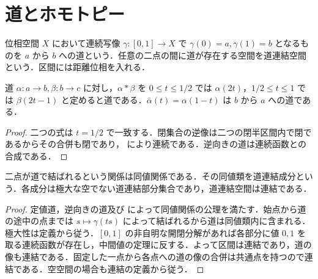 \section{道とホモトピー}
\begin{defn}[道と道連結性]
位相空間 $X$ において連続写像 $\gamma:[0,1]\to X$ で $\gamma(0)=a,\gamma(1)=b$ となるものを $a$ から $b$ への道という．任意の二点の間に道が存在する空間を道連結空間という．区間には距離位相を入れる．
\end{defn}
\begin{prop}[道の合成と逆向きの道]
道 $\alpha:a\to b,\beta:b\to c$ に対し，$\alpha*\beta$ を $0\leq t\leq1/2$ では $\alpha(2t)$，$1/2\leq t\leq1$ では $\beta(2t-1)$ と定めると道である．$\bar\alpha(t)=\alpha(1-t)$ は $b$ から $a$ への道である．
\end{prop}
\begin{proof}
二つの式は $t=1/2$ で一致する．閉集合の逆像は二つの閉半区間内で閉であるからその合併も閉であり， により連続である．逆向きの道は連続函数との合成である．
\end{proof}
\begin{prop}[道連結成分]
二点が道で結ばれるという関係は同値関係である．その同値類を道連結成分という．各成分は極大な空でない道連結部分集合であり，道連結空間は連結である．
\end{prop}
\begin{proof}
定値道，逆向きの道及び  によって同値関係の公理を満たす．始点から道の途中の点までは $s\mapsto\gamma(ts)$ によって結ばれるから道は同値類内に含まれる．極大性は定義から従う．$[0,1]$ の非自明な開閉分解があれば各部分に値 $0,1$ を取る連続函数が存在し，中間値の定理に反する．よって区間は連結であり，道の像も連結である．固定した一点から各点への道の像の合併は共通点を持つので連結である．空空間の場合も連結の定義から従う．
\end{proof}
